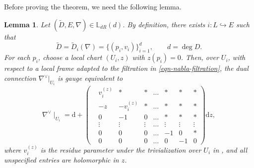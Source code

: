\documentclass[twoside, 11pt]{article}
\numberwithin{equation}{section}
\theoremstyle{theorem}
\numberwithin{theorem}{section}
\newtheorem{lemma}[lemma]{Lemma}
\theoremstyle{definition}
\begin{document}
Before proving the theorem, we need the following lemma.
\begin{lemma}\label{l: standard form near div dr}
Let $(\widetilde D,E,\nabla)\in\mathbb{L}_{dR}(d)$. By definition, there exists 
$i: L \hookrightarrow E$ such that 
\[
\widetilde D=\widetilde{D}_i(\nabla)=\{(p_i,v_i)\}_{i=1}^d,
\qquad d=\deg D.
\]
For each $p_i$, choose a local chart $(U_i,z)$ with $z(p_i)=0$.
Then, over $U_i$, with respect to a local frame adapted to the filtration in \eqref{eqn-nabla-filtration}, the dual connection $\nabla^{\vee}|_{U_i}$ is gauge equivalent to
\begin{equation}\label{e: gauge form for nabla Ui}
    \nabla^{\vee} \mid_{U_i} = \mathrm{d} +
    \begin{pmatrix}
        &v^{(z)}_i  &\ast &\ast &\dots &\ast &\ast &\ast  \\
        &-z &-v^{(z)}_i &\ast &\dots &\ast &\ast &\ast \\
        &0 &-1  &0 &\dots &\ast &\ast &\ast \\
        &\vdots &\vdots &\vdots &\dots &\vdots  &\vdots &\vdots \\
        &0  &0 &0 &\dots &-1 &0 &\ast \\
        &0  &0 &0 &\dots &0 &-1 & 0 
    \end{pmatrix} \mathrm{d}z,
\end{equation}
where $v^{(z)}_i$ is the residue parameter under the trivialization over $U_i$ in , and all unspecified entries are holomorphic in $z$.
\end{lemma}
\end{document}
